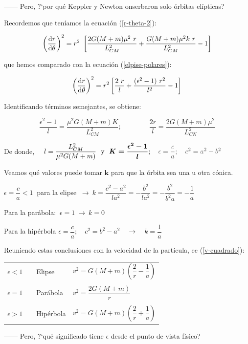 ------ Pero, ?`por qué Keppler y Newton onserbaron solo órbitas elípticas?

Recordemos que teníamos la ecuación (\ref{r-theta-2}):  

$$\left( \dv{r}{\theta} \right)^2 = r^2 \ \left[ \dfrac{2G(M+m)\mu^2\ r}{L^2_{CM}}+ \dfrac{G(M+m) \mu^2 k \ r}{L^2_{CM}} - 1   \right]$$

que hemos comparado con la ecuación (\ref{elpise-polares}):

$$\left( \dv{r}{\theta} \right)^2 = r^2  \left[ \dfrac{2 \ r}{l}+\dfrac{(\epsilon^2-1) \ r^2}{l^2} - 1 \right]	$$

Identificando términos semejantes, se obtiene:

$$\dfrac {\epsilon^2-1}{l}=	\dfrac{\mu^2 G (M+m) K}{L^2_{CM}}; \qquad \qquad \dfrac{2r}{l}=\dfrac{2G(M+m)\mu^2}{L^2_{CN}} $$

De donde, $\quad l=\dfrac {L^2_{CM}}{\mu^2 G (M+m)} \ \text{ y } \ \boldsymbol{K= \dfrac{\epsilon^2-1}{l}}; \quad  \textcolor{gris}{\epsilon=\dfrac c a ;\quad c^2=a^2-b^2}$	

Veamos qué valores puede tomar $\boldsymbol k$ para que la órbita sea una u otra cónica.

$\epsilon =\dfrac c a < 1\ $ para la elipse $\ \to \ k=\dfrac{c^2-a^2}{la^2}=-\dfrac{b^2}{la^2}=-\dfrac{b^2}{b^2a}=-\dfrac 1 a$

Para la parábola: $\ \epsilon=1 \ \to \ k=0$

Para la hipérbola $\epsilon=\dfrac c a;\quad c^2=b^2-a^2 \quad \to \quad k=\dfrac 1 a $

Reuniendo estas conclusiones con la velocidad de la partícula, ec (\ref{v-cuadrado}):

\begin{miparrafodestacado}
\begin{table}[H]
\centering
\begin{tabular}{lll}
$\epsilon<1\quad$ & Elipse$\quad$ & $v^2=G(M+m)\left(\dfrac 2 r-\dfrac 1 a \right)$ \\ \\
$\epsilon=1$      & Parábola      & $v^2=\dfrac{2G(M+m)}{r}$                        \\ \\
$\epsilon>1$      & Hipérbola     & $v^2=G(M+m)\left(\dfrac 2 r+\dfrac 1 a \right)$
\end{tabular}
\end{table}	
\end{miparrafodestacado}

------ Pero, ?`qué significado tiene $\epsilon$ desde el punto de vista físico?


